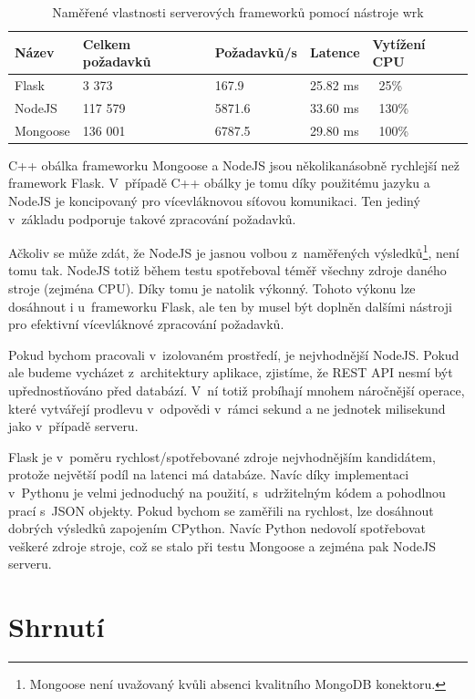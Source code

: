 \begin{table}[ht]
\centering
\begin{tabular}{|l|l|l|l|l|}
\hline
    Název       & Celkem požadavků  & Požadavků/s   & Latence   & Vytížení CPU\\ \hline
    Flask       & 3 373             & 167.9         & 25.82 ms  & ~25\%\\
    NodeJS      & 117 579           & 5871.6        & 33.60 ms  & ~130\%\\
    Mongoose    & 136 001           & 6787.5        & 29.80 ms  & ~100\%\\
   \hline
\end{tabular}
\caption{Naměřené vlastnosti serverových frameworků pomocí nástroje wrk}
\label{tab:server}
\end{table}

C++ obálka frameworku Mongoose a NodeJS jsou několikanásobně rychlejší než framework Flask. V~případě C++ obálky je tomu díky použitému jazyku a NodeJS je koncipovaný pro vícevláknovou síťovou komunikaci. Ten jediný v~základu podporuje takové zpracování požadavků. 

Ačkoliv se může zdát, že NodeJS je jasnou volbou z~naměřených výsledků\footnote{Mongoose není uvažovaný kvůli absenci kvalitního MongoDB konektoru.}, není tomu tak. NodeJS totiž během testu spotřeboval téměř všechny zdroje daného stroje (zejména CPU). Díky tomu je natolik výkonný. Tohoto výkonu lze dosáhnout i u~frameworku Flask, ale ten by musel být doplněn dalšími nástroji pro efektivní vícevláknové zpracování požadavků.

Pokud bychom pracovali v~izolovaném prostředí, je nejvhodnější NodeJS. Pokud ale budeme vycházet z~architektury aplikace, zjistíme, že REST API nesmí být upřednostňováno před databází. V~ní totiž probíhají mnohem náročnější operace, které vytvářejí prodlevu v~odpovědi v~rámci sekund a ne jednotek milisekund jako v~případě serveru. 

Flask je v~poměru rychlost/spotřebované zdroje nejvhodnějším kandidátem, protože největší podíl na latenci má databáze. Navíc díky implementaci v~Pythonu je velmi jednoduchý na použití, s~udržitelným kódem a pohodlnou prací s~JSON objekty. Pokud bychom se zaměřili na rychlost, lze dosáhnout dobrých výsledků zapojením CPython. Navíc Python nedovolí spotřebovat veškeré zdroje stroje, což se stalo při testu Mongoose a zejména pak NodeJS serveru.

\section{Shrnutí}

